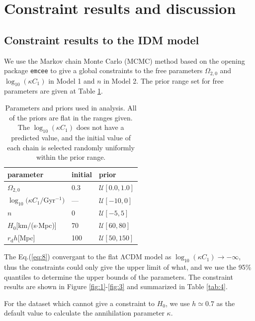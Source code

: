 \documentclass[twocolumn]{aastex631}
\begin{document}
\section{Constraint results and discussion}\label{sec:4}

\subsection{Constraint results to the IDM model}

   We use the Markov chain Monte Carlo (MCMC) method based 
   on the opening package \texttt{emcee} to give a global constraints
   to the free parameters $\Omega_{2,0}$ and $\log_{10}(\kappa C_1)$ in 
   Model 1 and $n$ in Model 2.
   The prior range set for free parameters are given at Table \ref{tab:3}.

   \begin{table}
      \centering
      \begin{tabular}{lll}
         \hline\hline
         parameter & initial & prior \\
         \hline
         $\Omega_{2,0}$ & 0.3 & $\mathcal{U}[0.0,1.0]$ \\
         $\log_{10}(\kappa C_1/$Gyr${}^{-1})$ & --- & $\mathcal{U}[-10,0]$ \\
         $n$ & 0 & $\mathcal{U}[-5,5]$ \\
         \hline
         $H_0$[km/(s$\cdot$Mpc)] & 70 & $\mathcal{U}[60,80]$ \\
         $r_{\text{d}}h$[Mpc] & 100 & $\mathcal{U}[50,150]$ \\
         \hline
      \end{tabular}
      \caption{Parameters and priors used in analysis. 
      All of the priors are flat in the ranges given. 
      The $\log_{10}(\kappa C_1)$ does not have a predicted value, 
      and the initial value of each chain is selected randomly uniformly
      within the prior range.}
      \label{tab:3}
   \end{table}

   The Eq.(\ref{eq:8}) convergant to the flat ΛCDM model as
   $\log_{10}(\kappa C_1)\to-\infty$, thus the constraints
   could only give the upper limit of what, and we use the
   95\% quantiles to determine the upper bounds of the parameters. 
   The constraint results are shown in 
   Figure \ref{fig:1}-\ref{fig:3} and summarized in Table \ref{tab:4}.


   For the dataset which cannot give a constraint to $H_0$, 
   we use $h \simeq 0.7$ as the default value to calculate the 
   annihilation parameter $\kappa$.
\end{document}

